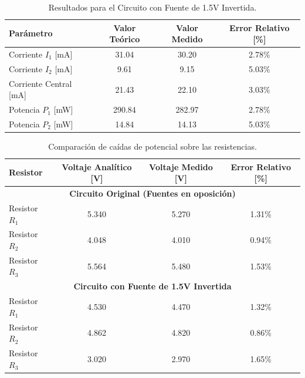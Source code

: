 \documentclass[11pt]{article}
\begin{document}
\begin{table}[H]
    \centering
    \begin{tabular}{l|ccc}
        \toprule
        \textbf{Parámetro} & \textbf{Valor Teórico} & \textbf{Valor Medido} & \textbf{Error Relativo [\%]} \\ 
        \midrule
        Corriente $I_1$ [mA]    & 31.04                       & 30.20                      & 2.78\%                     \\ 
        Corriente $I_2$ [mA]    & 9.61                        & 9.15                       & 5.03\%                     \\ 
        Corriente Central [mA]  & 21.43                       & 22.10                      & 3.03\%                     \\ 
        \midrule
        Potencia $P_1$ [mW]     & 290.84                      & 282.97                     & 2.78\%                     \\
        Potencia $P_2$ [mW]     & 14.84                       & 14.13                      & 5.03\%                     \\
        \bottomrule
    \end{tabular}
    \caption{Resultados para el Circuito con Fuente de 1.5V Invertida.}
    \label{tab:kirchhoff_2}
\end{table}

\begin{table}[H]
    \centering
    \begin{tabular}{l|ccc}
        \toprule
        \textbf{Resistor} & \textbf{Voltaje Analítico [V]} & \textbf{Voltaje Medido [V]} & \textbf{Error Relativo [\%]} \\ 
        \midrule
        \multicolumn{4}{c}{\textbf{Circuito Original (Fuentes en oposición)}} \\
        \midrule
        Resistor $R_1$ & 5.340 & 5.270 & 1.31\% \\ 
        Resistor $R_2$ & 4.048 & 4.010 & 0.94\% \\ 
        Resistor $R_3$ & 5.564 & 5.480 & 1.53\% \\ 
        \midrule
        \multicolumn{4}{c}{\textbf{Circuito con Fuente de 1.5V Invertida}} \\
        \midrule
        Resistor $R_1$ & 4.530 & 4.470 & 1.32\% \\ 
        Resistor $R_2$ & 4.862 & 4.820 & 0.86\% \\ 
        Resistor $R_3$ & 3.020 & 2.970 & 1.65\% \\ 
        \bottomrule
    \end{tabular}
    \caption{Comparación de caídas de potencial sobre las resistencias.}
    \label{tab:caidas_potencial}
\end{table}
\end{document}
